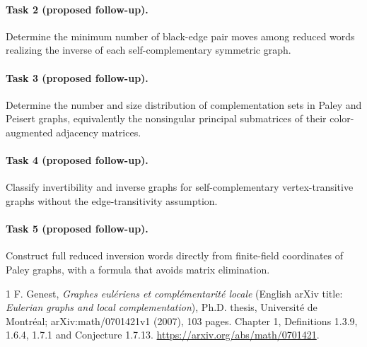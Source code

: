 \documentclass[11pt]{article}
\begin{document}
\paragraph{Task 2 (proposed follow-up).}
Determine the minimum number of black-edge pair moves among reduced
words realizing the inverse of each self-complementary symmetric graph.

\paragraph{Task 3 (proposed follow-up).}
Determine the number and size distribution of complementation sets
in Paley and Peisert graphs, equivalently the nonsingular principal
submatrices of their color-augmented adjacency matrices.

\paragraph{Task 4 (proposed follow-up).}
Classify invertibility and inverse graphs for self-complementary
vertex-transitive graphs without the edge-transitivity assumption.

\paragraph{Task 5 (proposed follow-up).}
Construct full reduced inversion words directly from finite-field
coordinates of Paley graphs, with a formula that avoids matrix elimination.

\begin{thebibliography}{1}
F. Genest, \emph{Graphes eul\'eriens et compl\'ementarit\'e locale}
(English arXiv title: \emph{Eulerian graphs and local complementation}),
Ph.D. thesis, Universit\'e de Montr\'eal; arXiv:math/0701421v1 (2007),
103 pages. Chapter 1, Definitions 1.3.9, 1.6.4, 1.7.1 and
Conjecture 1.7.13.
\url{https://arxiv.org/abs/math/0701421}.
\end{thebibliography}
\end{document}
